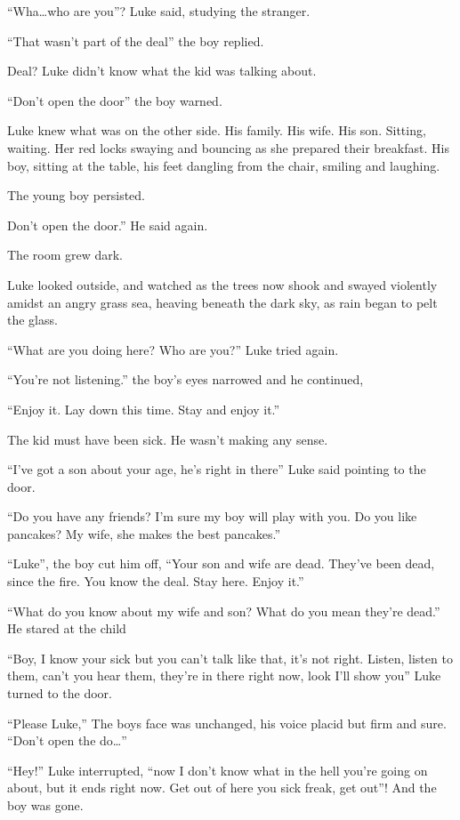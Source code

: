 ``Wha{\ldots}who are you''? Luke said, studying the
stranger.

``That wasn't part of the deal'' the boy
replied.

Deal? Luke didn't know what the kid was talking about.

``Don't open the door'' the boy warned.

Luke knew what was on the other side. His family. His wife. His
son. Sitting, waiting. Her red locks swaying and bouncing as she
prepared their breakfast. His boy, sitting at the table, his feet
dangling from the chair, smiling and laughing.

The young boy persisted.

Don't open the door.'' He said again.

The room grew dark.

Luke looked outside, and watched as the trees now shook and swayed
violently amidst an angry grass sea, heaving beneath the dark sky,
as rain began to pelt the glass.

``What are you doing here? Who are you?'' Luke tried
again.

``You're not listening.'' the boy's eyes
narrowed and he continued,

``Enjoy it. Lay down this time. Stay and enjoy
it.''



The kid must have been sick. He wasn't making any
sense.

``I've got a son about your age, he's right in
there'' Luke said pointing to the door.

``Do you have any friends? I'm sure my boy will play
with you. Do you like pancakes? My wife, she makes the best
pancakes.''

``Luke'', the boy cut him off, ``Your son and wife
are dead. They've been dead, since the fire. You know the
deal. Stay here. Enjoy it.''

``What do you know about my wife and son? What do you mean
they're dead.'' He stared at the child

``Boy, I know your sick but you can't talk like that,
it's not right. Listen, listen to them, can't you hear
them, they're in there right now, look I'll show
you'' Luke turned to the door.

``Please Luke,'' The boys face was unchanged, his voice
placid but firm and sure. ``Don't open the
do{\ldots}''

``Hey!'' Luke interrupted, ``now I don't know
what in the hell you're going on about, but it ends right
now. Get out of here you sick freak, get out''! And the boy
was gone.

